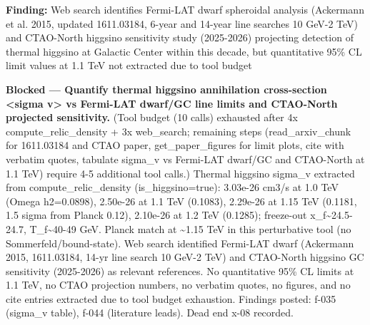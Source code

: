 \documentclass[11pt,a4paper]{article}
\begin{document}
\textbf{Finding:} Web search identifies Fermi-LAT dwarf spheroidal analysis (Ackermann et al. 2015, updated 1611.03184, 6-year and 14-year line searches 10 GeV-2 TeV) and CTAO-North higgsino sensitivity study (2025-2026) projecting detection of thermal higgsino at Galactic Center within this decade, but quantitative 95\% CL limit values at 1.1 TeV not extracted due to tool budget

\textbf{Blocked --- Quantify thermal higgsino annihilation cross-section \textless{}sigma v\textgreater{} vs Fermi-LAT dwarf/GC line limits and CTAO-North projected sensitivity.} (Tool budget (10 calls) exhausted after 4x compute\_relic\_density + 3x web\_search; remaining steps (read\_arxiv\_chunk for 1611.03184 and CTAO paper, get\_paper\_figures for limit plots, cite with verbatim quotes, tabulate sigma\_v vs Fermi-LAT dwarf/GC and CTAO-North at 1.1 TeV) require 4-5 additional tool calls.) Thermal higgsino sigma\_v extracted from compute\_relic\_density (is\_higgsino=true): 3.03e-26 cm3/s at 1.0 TeV (Omega h2=0.0898), 2.50e-26 at 1.1 TeV (0.1083), 2.29e-26 at 1.15 TeV (0.1181, 1.5 sigma from Planck 0.12), 2.10e-26 at 1.2 TeV (0.1285); freeze-out x\_f\textasciitilde{}24.5-24.7, T\_f\textasciitilde{}40-49 GeV. Planck match at \textasciitilde{}1.15 TeV in this perturbative tool (no Sommerfeld/bound-state). Web search identified Fermi-LAT dwarf (Ackermann 2015, 1611.03184, 14-yr line search 10 GeV-2 TeV) and CTAO-North higgsino GC sensitivity (2025-2026) as relevant references. No quantitative 95\% CL limits at 1.1 TeV, no CTAO projection numbers, no verbatim quotes, no figures, and no cite entries extracted due to tool budget exhaustion. Findings posted: f-035 (sigma\_v table), f-044 (literature leads). Dead end x-08 recorded.
\end{document}
